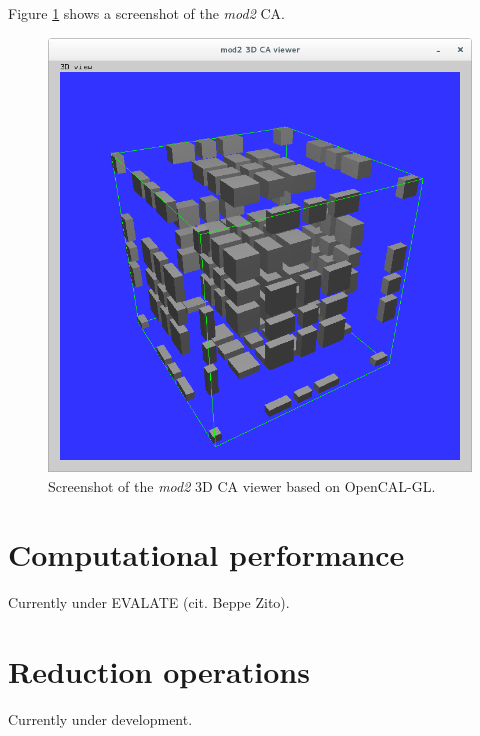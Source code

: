 Figure \ref{fig:calgl_mod2} shows a screenshot of the \emph{mod2} CA.

\begin{figure}
  \begin{center}
    \includegraphics[width=12cm]{./images/OpenCAL/calgl_mod2}
    \caption{Screenshot of the \emph{mod2} 3D CA viewer based on
      OpenCAL-GL.}
    \label{fig:calgl_mod2}
  \end{center}
\end{figure}


\section{Computational performance}
Currently under EVALATE (cit. Beppe Zito).


\section{Reduction operations}
Currently under development.

